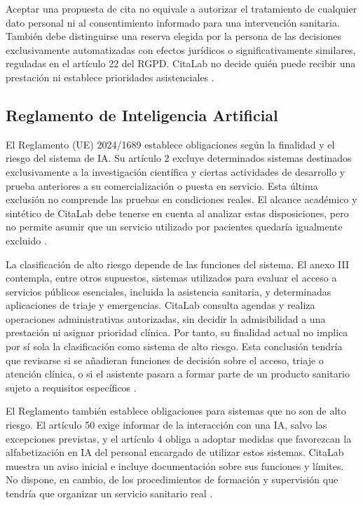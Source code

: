 Aceptar una propuesta de cita no equivale a autorizar el tratamiento de cualquier dato personal ni al consentimiento informado para una intervención sanitaria. También debe distinguirse una reserva elegida por la persona de las decisiones exclusivamente automatizadas con efectos jurídicos o significativamente similares, reguladas en el artículo 22 del RGPD. CitaLab no decide quién puede recibir una prestación ni establece prioridades asistenciales \citep{eu2016gdpr}.

\subsection{Reglamento de Inteligencia Artificial}

El Reglamento (UE) 2024/1689 establece obligaciones según la finalidad y el riesgo del sistema de IA. Su artículo 2 excluye determinados sistemas destinados exclusivamente a la investigación científica y ciertas actividades de desarrollo y prueba anteriores a su comercialización o puesta en servicio. Esta última exclusión no comprende las pruebas en condiciones reales. El alcance académico y sintético de CitaLab debe tenerse en cuenta al analizar estas disposiciones, pero no permite asumir que un servicio utilizado por pacientes quedaría igualmente excluido \citep{eu2024aiact}.

La clasificación de alto riesgo depende de las funciones del sistema. El anexo III contempla, entre otros supuestos, sistemas utilizados para evaluar el acceso a servicios públicos esenciales, incluida la asistencia sanitaria, y determinadas aplicaciones de triaje y emergencias. CitaLab consulta agendas y realiza operaciones administrativas autorizadas, sin decidir la admisibilidad a una prestación ni asignar prioridad clínica. Por tanto, su finalidad actual no implica por sí sola la clasificación como sistema de alto riesgo. Esta conclusión tendría que revisarse si se añadieran funciones de decisión sobre el acceso, triaje o atención clínica, o si el asistente pasara a formar parte de un producto sanitario sujeto a requisitos específicos \citep{eu2024aiact,eu2026aiactamendment}.

El Reglamento también establece obligaciones para sistemas que no son de alto riesgo. El artículo 50 exige informar de la interacción con una IA, salvo las excepciones previstas, y el artículo 4 obliga a adoptar medidas que favorezcan la alfabetización en IA del personal encargado de utilizar estos sistemas. CitaLab muestra un aviso inicial e incluye documentación sobre sus funciones y límites. No dispone, en cambio, de los procedimientos de formación y supervisión que tendría que organizar un servicio sanitario real \citep{eu2024aiact,eu2026aiactamendment}.

